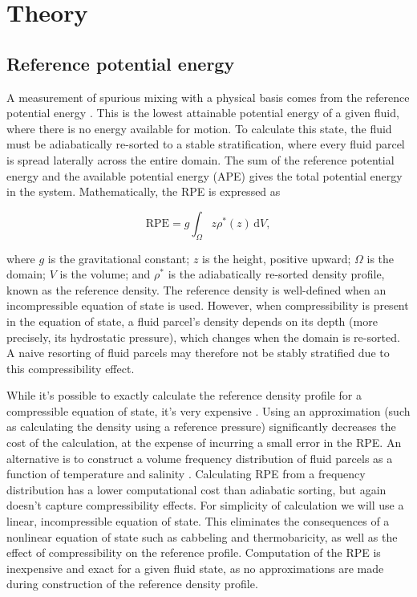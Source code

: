 \section{Theory}
\subsection{Reference potential energy}
A measurement of spurious mixing with a physical basis comes from the reference potential energy \citep[known also as background potential energy][]{winters95}. This is the lowest attainable potential energy of a given fluid, where there is no energy available for motion. To calculate this state, the fluid must be adiabatically re-sorted to a stable stratification, where every fluid parcel is spread laterally across the entire domain. The sum of the reference potential energy and the available potential energy (APE) gives the total potential energy in the system. Mathematically, the RPE is expressed as

\begin{equation}
  \mathrm{RPE} = g \int_\Omega z \rho^*(z)\,\mathrm dV,
\end{equation}

where $g$ is the gravitational constant; $z$ is the height, positive upward; $\Omega$ is the domain; $V$ is the volume; and $\rho^*$ is the adiabatically re-sorted density profile, known as the reference density. The reference density is well-defined when an incompressible equation of state is used. However, when compressibility is present in the equation of state, a fluid parcel's density depends on its depth (more precisely, its hydrostatic pressure), which changes when the domain is re-sorted. A naive resorting of fluid parcels may therefore not be stably stratified due to this compressibility effect.


While it's possible to exactly calculate the reference density profile for a compressible equation of state, it's very expensive \citep{ilicak12}. Using an approximation (such as calculating the density using a reference pressure) significantly decreases the cost of the calculation, at the expense of incurring a small error in the RPE. An alternative is to construct a volume frequency distribution of fluid parcels as a function of temperature and salinity \citep{saenz15}. Calculating RPE from a frequency distribution has a lower computational cost than adiabatic sorting, but again doesn't capture compressibility effects. For simplicity of calculation we will use a linear, incompressible equation of state. This eliminates the consequences of a nonlinear equation of state such as cabbeling and thermobaricity, as well as the effect of compressibility on the reference profile. Computation of the RPE is inexpensive and exact for a given fluid state, as no approximations are made during construction of the reference density profile.

